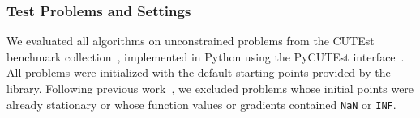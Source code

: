 \documentclass[journal_revised_MPC]{subfiles}
\begin{document}
\subsubsection{Test Problems and Settings}\label{sssec:problems}

We evaluated all algorithms on unconstrained problems from the CUTEst benchmark collection~\citep{gouldCUTEstConstrainedUnconstrained2015}, implemented in Python using the PyCUTEst interface~\citep{PyCUTEst2022}.
All problems were initialized with the default starting points provided by the library.
Following previous work~\citep{kanzowRegularizationLimitedMemory2023}, we excluded problems whose initial points were already stationary or whose function values or gradients contained \texttt{NaN} or \texttt{INF}.
\end{document}
